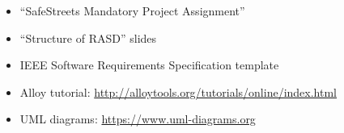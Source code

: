 \clearpage
{}


\begin{itemize}
\item
“SafeStreets Mandatory Project Assignment”
\item
“Structure of RASD” slides
\item
IEEE Software Requirements Specification template
\item
Alloy tutorial: \url{http://alloytools.org/tutorials/online/index.html}
\item
UML diagrams: \url{https://www.uml-diagrams.org}
\end{itemize}





